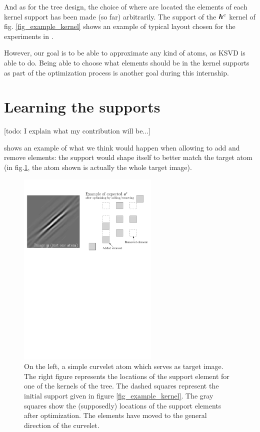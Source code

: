 And as for the tree design, the choice of where are located the elements of each kernel support has been made (so far) arbitrarily. The support of the $\bm{h}^e$ kernel of fig. \ref{fig_example_kernel} shows an example of typical layout chosen for the experiments in \cite{chabiron_optimization_2016}. 

However, our goal is to be able to approximate any kind of atoms, as \ac{KSVD} is able to do. Being able to choose what elements should be in the kernel supports as part of the optimization process is another goal during this internship.

\section{Learning the supports}
[todo: I explain what my contribution will be...]

 shows an example of what we think would happen when allowing to add and remove elements: the support would shape itself to better match the target atom (in fig.\ref{fig_example_optimal_support}, the atom shown is actually the whole target image).

\begin{figure}[!ht] \centering
\includegraphics[width=0.6\textwidth]{figures/add-rm-elmts-support.pdf}
\caption{On the left, a simple curvelet atom which serves as target image. The right figure represents the locations of the support element for one of the kernels of the tree. The dashed squares represent the initial support given in figure \ref{fig_example_kernel}. The gray squares show the (supposedly) locations of the support elements after optimization. The elements have moved to the general direction of the curvelet.\label{fig_example_optimal_support}}
\end{figure}




